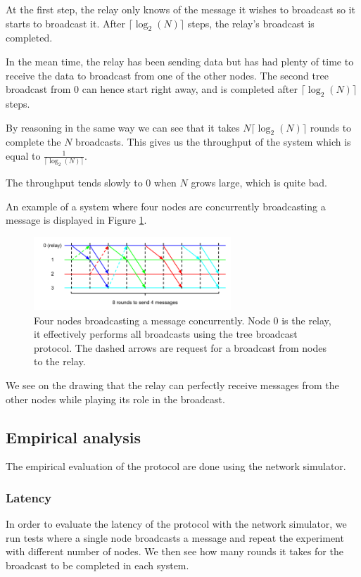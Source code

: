 \documentclass[a4paper]{article}
\begin{document}
At the first step, the relay only knows of the message it wishes to broadcast
so it starts to broadcast it. After $\lceil\log_2(N)\rceil$ steps, the relay's
broadcast is completed.

In the mean time, the relay has been sending data but has had plenty of time
to receive the data to broadcast from one of the other nodes. The second tree
broadcast from $0$ can hence start right away, and is completed after
$\lceil\log_2(N)\rceil$ steps.

By reasoning in the same way we can see that it takes $N \lceil\log_2(N)\rceil$
rounds to complete the $N$ broadcasts. This gives us the throughput of the
system which is equal to $\frac{1}{\lceil\log_2(N)\rceil}$.

The throughput tends slowly to $0$ when $N$ grows large, which is quite bad.

An example of a system where four nodes are concurrently broadcasting a message
is displayed in Figure \ref{figure:throughput}.

\begin{figure}[h]
    \centering
    \includegraphics[width=280px]{Throughput.png}
    \caption{Four nodes broadcasting a message concurrently. Node 0 is the relay, it effectively performs all broadcasts using the tree broadcast protocol. The dashed arrows are request for a broadcast from nodes to the relay.}
    \label{figure:throughput}
\end{figure}

We see on the drawing that the relay can perfectly receive messages from the
other nodes while playing its role in the broadcast.

\subsection{Empirical analysis}
The empirical evaluation of the protocol are done using the network simulator.

\subsubsection{Latency}
In order to evaluate the latency of the protocol with the network simulator,
we run tests where a single node broadcasts a message and repeat the experiment
with different number of nodes. We then see how many rounds it takes for the
broadcast to be completed in each system.
\end{document}
